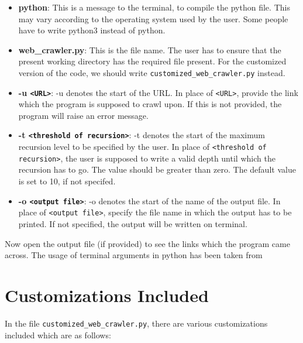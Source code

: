 \documentclass{report}
\begin{document}
\begin{itemize}
    \item \textbf{python}: This is a message to the terminal, to compile the python file. This may vary according to the operating system used by the user. Some people have to write python3 instead of python.
    \item \textbf{web{\_}crawler.py}: This is the file name. The user has to ensure that the present working directory has the required file present. For the customized version of the code, we should write \texttt{customized\_web\_crawler.py} instead.
    \item \textbf{-u \texttt{<URL>}}: -u denotes the start of the URL. In place of \texttt{<URL>}, provide the link which the program is supposed to crawl upon. If this is not provided, the program will raise an error message.
    \item \textbf{-t \texttt{<threshold of recursion>}}: -t denotes the start of the maximum recursion level to be specified by the user. In place of \texttt{<threshold of recursion>}, the user is supposed to write a valid depth until which the recursion has to go. The value should be greater than zero. The default value is set to 10, if not specifed.
    \item \textbf{-o \texttt{<output file>}}: -o denotes the start of the name of the output file. In place of \texttt{<output file>}, specify the file name in which the output has to be printed. If not specified, the output will be written on terminal.
\end{itemize}

Now open the output file (if provided) to see the links which the program came across. The usage of terminal arguments in python has been taken from \cite{command_line_arguments}

\section{Customizations Included}
In the file \texttt{customized\_web\_crawler.py}, there are various customizations included which are as follows:
\end{document}
